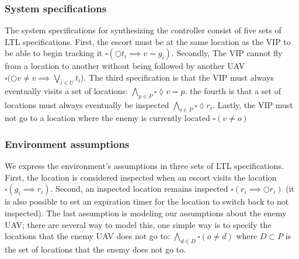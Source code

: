 \documentclass[]{article}
\begin{document}
\subsubsection{System specifications}\label{system-specifications}
The system specifications for synthesizing the controller consist of five 
sets of LTL specifications. First, the escort must be at the same location as the 
VIP to be able to begin tracking it $\square (\Circle t_{i} \implies v = g_{i})$.
Secondly, The VIP cannot fly from a location to another without being followed by
another UAV $\square(\Circle v \neq v \implies \bigvee\limits_{i\in U}t_{i}$). 
The third specification is that the VIP must always eventually visits a set of
locations: $\bigwedge\limits_{p\in P}\square \lozenge v=p$. the fourth is that a set of
locations must always eventually be inspected $\bigwedge\limits_{i\in P}\square \lozenge
r_{i}$. Lastly, the VIP must not go to a location where the enemy is currently located
$\square (v \neq o)$
\subsubsection{Environment assumptions}\label{environment-assumptions}
We express the environment's assumptions in three sets of LTL specifications. 
First, the location is considered inspected when an escort visits the location $\square
(g_{i} \implies r_{i})$. Second, an inspected location remains inspected $\square (r_{i}
\implies \Circle r_{i})$ (it is also possible to set an expiration timer for the
location to switch back to not inspected). The last assumption is modeling our assumptions about the enemy UAV; there are several way to model this, one simple way is to specify the locations that the enemy UAV does not go to: $\bigwedge\limits_{d\in D} \square (o \neq d)$ where $D \subset P$ is the set of locations that the enemy does not go to.
\end{document}
